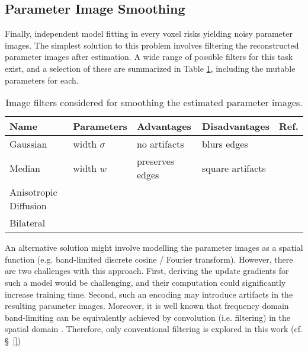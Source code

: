 \subsection{Parameter Image Smoothing}\label{ss:meth-smooth}
Finally, independent model fitting in every voxel risks yielding noisy parameter images.
The simplest solution to this problem involves filtering the reconstructed parameter images after estimation.
A wide range of possible filters for this task exist, and a selection of these are summarized in Table \ref{tab:filters}, including the mutable parameters for each.
\begin{table} %
  \centering
  \caption{Image filters considered for smoothing the estimated parameter images.}
  \label{tab:filters}
  \begin{tabular}{llllc}
  	\hline
  	Name                  &   Parameters   & Advantages      & Disadvantages    & Ref. \\ \hline
  	Gaussian              & width $\sigma$ & no artifacts    & blurs edges      &      \\
  	Median                &   width $w$    & preserves edges & square artifacts &      \\
  	Anisotropic Diffusion &                &                 &                  &      \\
  	Bilateral             &                &                 &                  &      \\ \hline
  \end{tabular}
\end{table}
\par
An alternative solution might involve modelling the parameter images as a spatial function (e.g. band-limited discrete cosine / Fourier transform).
However, there are two challenges with this approach.
First, deriving the update gradients for such a model would be challenging, and their computation could significantly increase training time.
Second, such an encoding may introduce artifacts in the resulting parameter images.
Moreover, it is well known that frequency domain band-limiting can be equivalently achieved by convolution (i.e. filtering) in the spatial domain \cite{Gonzalez2006}.
Therefore, only conventional filtering is explored in this work (cf. \S\ \ref{})
